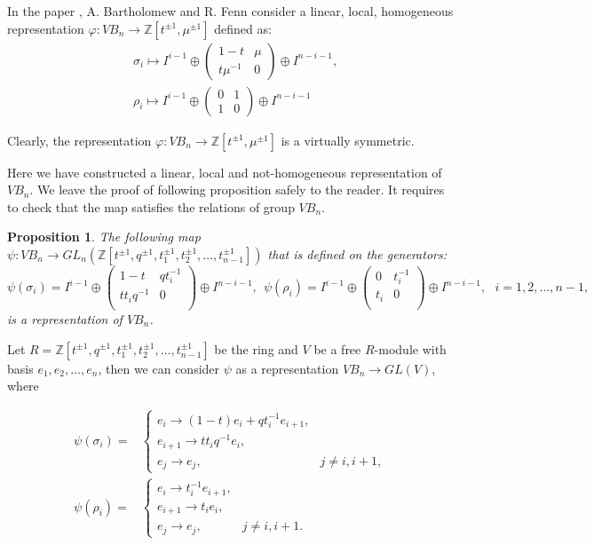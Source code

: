 \documentclass[11 pt, reqno]{amsart}
\newtheorem{proposition}[theorem]{Proposition}
\theoremstyle{definition}
\numberwithin{equation}{subsection}
\begin{document}
In the paper \cite[Section 7]{BF-2}, A. Bartholomew and R. Fenn consider a linear, local, homogeneous representation $\varphi:VB_n \to \mathbb{Z}[t^{\pm 1}, \mu^{\pm 1}]$ defined as: 
\begin{align*}
&\sigma_i \mapsto I^{i-1} \oplus \begin{pmatrix}
1-t & \mu \\
t \mu^{-1} & 0
\end{pmatrix} \oplus I^{n-i-1},\\
&\rho_i \mapsto I^{i-1} \oplus \begin{pmatrix}
0  & 1 \\
1 & 0
\end{pmatrix} \oplus I^{n-i-1}
\end{align*}

Clearly, the representation $\varphi: VB_n \to \mathbb{Z}[t^{\pm 1}, \mu^{\pm 1}]$ is a virtually symmetric.

Here we have constructed a linear, local and not-homogeneous representation of $VB_n$. We leave the proof of following proposition safely to the reader. It requires to check that the map satisfies the relations of group $VB_n$.

\begin{proposition}\label{not-homogeneous-virtual}
The following map $\psi : VB_n \to GL_n(\mathbb{Z}[t^{\pm 1}, q^{\pm 1}, t_1^{\pm 1}, t_2^{\pm 1}, \ldots, t_{n-1}^{\pm 1}])$ that is defined on the generators:
$$
\psi(\sigma_i) = I^{i-1} \oplus \left(
\begin{array}{cc}
  1-t &  q t_i^{-1} \\
t t_i q^{-1} & 0 \\
\end{array}
\right) \oplus I^{n-i-1},~~
\psi(\rho_i) = I^{i-1} \oplus \left(
\begin{array}{cc}
0 &   t_i^{-1} \\
 t_i  & 0 \\
\end{array}
\right) \oplus I^{n-i-1},
~~~i = 1, 2, \ldots, n-1,
$$
is a representation of $VB_n$.
\end{proposition}

Let $R=\mathbb{Z}[t^{\pm 1}, q^{\pm 1}, t_1^{\pm 1}, t_2^{\pm 1}, \ldots, t_{n-1}^{\pm 1}]$ be the ring and $V$ be a free $R$-module with basis $e_1, e_2, \ldots, e_n$, then we can consider   $\psi$ as a representation $VB_n \to GL(V)$, where


\begin{align*}
\psi(\sigma_i) =&  \left\{
\begin{array}{ll}
e_i \to  (1-t) e_i + q t_i^{-1} e_{i+1}, &   \\
e_{i+1} \to t t_i q^{-1} e_i, & \\
e_j \to e_j, & j \not= i, i+1,
\end{array}
\right.\\
\psi(\rho_i) =&  \left\{
\begin{array}{ll}
e_i \to   t_i^{-1} e_{i+1}, &   \\
e_{i+1} \to t_i e_i, & \\
e_j \to e_j, & j \not= i, i+1.
\end{array}
\right.
\end{align*}
\end{document}
